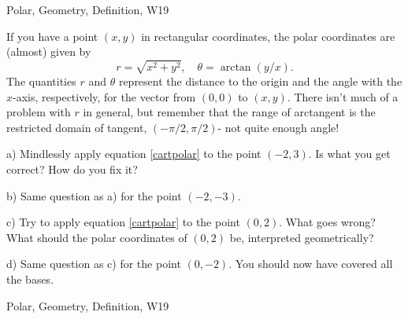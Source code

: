 \begin{tagblock}{Polar, Geometry, Definition, W19}
\begin{question}
	If you have a point $(x,y)$ in rectangular coordinates, the polar coordinates are (almost) given by 
\begin{equation}\label{cartpolar}
r=\sqrt{x^2+y^2}, \quad \theta=\arctan(y/x).
\end{equation}
The quantities $r$ and $\theta$ represent the distance to the origin and the angle with the $x$-axis, respectively, for the vector from $(0,0)$ to $(x,y)$. There isn't much of a problem with $r$ in general, but remember that the range of arctangent is the restricted domain of tangent, $(-\pi/2,\pi/2)$- not quite enough angle!

\bigskip

a) Mindlessly apply equation \eqref{cartpolar} to the point $(-2,3)$. Is what you get correct? How do you fix it?

\bigskip

b) Same question as a) for the point $(-2,-3)$.

\bigskip

c) Try to apply equation \eqref{cartpolar} to the point $(0,2)$. What goes wrong? What should the polar coordinates of $(0,2)$ be, interpreted geometrically?

\bigskip

d) Same question as c) for the point $(0,-2)$. You should now have covered all the bases. 
	
	
\begin{tags}
	    Polar, Geometry, Definition, W19
\end{tags}
	
\begin{diary}
\end{diary}
	
\begin{solution}
	   
\end{solution}
	
\end{question}

\end{tagblock}



